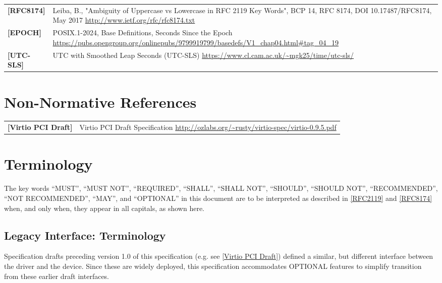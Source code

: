 \begin{longtable}{l p{5in}}
	\label{intro:rfc8174}\textbf{[RFC8174]} &
    Leiba, B., "Ambiguity of Uppercase vs Lowercase in RFC 2119 Key Words", BCP
    14, RFC 8174, DOI 10.17487/RFC8174, May 2017
        \newline\url{http://www.ietf.org/rfc/rfc8174.txt}\\
	\label{intro:EPOCH}\textbf{[EPOCH]} &
    POSIX.1-2024, Base Definitions, Seconds Since the Epoch
	\newline\url{https://pubs.opengroup.org/onlinepubs/9799919799/basedefs/V1_chap04.html#tag_04_19}\\
	\label{intro:UTC-SLS}\textbf{[UTC-SLS]} &
    UTC with Smoothed Leap Seconds (UTC-SLS)
	\newline\url{https://www.cl.cam.ac.uk/~mgk25/time/utc-sls/}\\
\end{longtable}

\section{Non-Normative References}

\begin{longtable}{l p{5in}}
	\label{intro:Virtio PCI Draft}\textbf{[Virtio PCI Draft]} &
	Virtio PCI Draft Specification
	\newline\url{http://ozlabs.org/~rusty/virtio-spec/virtio-0.9.5.pdf}\\
\end{longtable}

\section{Terminology}\label{Terminology}

The key words ``MUST'', ``MUST NOT'', ``REQUIRED'', ``SHALL'', ``SHALL NOT'',
``SHOULD'', ``SHOULD NOT'', ``RECOMMENDED'', ``NOT RECOMMENDED'', ``MAY'', and
``OPTIONAL'' in this document are to be interpreted as described in
\hyperref[intro:rfc2119]{[RFC2119]} and \hyperref[intro:rfc8174]{[RFC8174]} when,
and only when, they appear in all capitals, as shown here.
\subsection{Legacy Interface: Terminology}\label{intro:Legacy
Interface: Terminology}

Specification drafts preceding version 1.0 of this specification
(e.g. see \hyperref[intro:Virtio PCI Draft]{[Virtio PCI Draft]})
defined a similar, but different
interface between the driver and the device.
Since these are widely deployed, this specification
accommodates OPTIONAL features to simplify transition
from these earlier draft interfaces.

